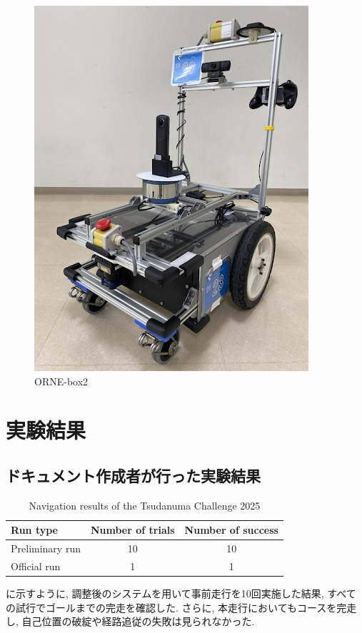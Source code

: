 \begin{figure}[hbtp]
  \centering
 \includegraphics[keepaspectratio, scale=0.3]
      {images/box2.png}
 \caption{ORNE-box2}
 \label{Fig:ORNE-box2}
\end{figure}




\newpage
\section{実験結果}
\subsection{ドキュメント作成者が行った実験結果}
\begin{table}[htbp]
  \centering
  \caption{Navigation results of the Tsudanuma Challenge 2025}
  \label{tab:tsudanuma_result}
  \begin{tabular}{lcc}
    \hline
    \textbf{Run type} & \textbf{Number of trials} & \textbf{Number of success} \\
    \hline
    Preliminary run & 10 & 10 \\
    Official run        & 1  & 1  \\
    \hline
  \end{tabular}
\end{table}
に示すように, 調整後のシステムを用いて事前走行を10回実施した結果, すべての試行でゴールまでの完走を確認した. 
さらに, 本走行においてもコースを完走し, 自己位置の破綻や経路追従の失敗は見られなかった. 

